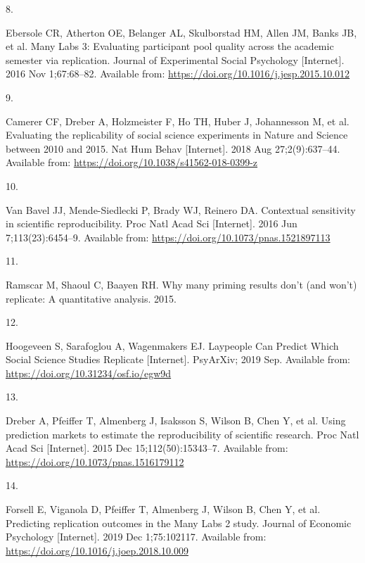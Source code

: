 \documentclass[
  english,
  a4paper,
]{article}
\newlength{\cslhangindent}
\newlength{\csllabelwidth}
\newlength{\cslentryspacingunit} %
\newenvironment{CSLReferences}[2] %
 {%
  \setlength{\parindent}{0pt}
  \ifodd #1
  \let\oldpar\par
  \def\par{\hangindent=\cslhangindent\oldpar}
  \fi
  \setlength{\parskip}{#2\cslentryspacingunit}
 }%
 {}
\newcommand{\CSLLeftMargin}[1]{\parbox[t]{\csllabelwidth}{#1}}
\newcommand{\CSLRightInline}[1]{\parbox[t]{\linewidth - \csllabelwidth}{#1}\break}
\begin{document}
\begin{CSLReferences}{0}{0}
\leavevmode{}%
\CSLLeftMargin{8. }%
\CSLRightInline{Ebersole CR, Atherton OE, Belanger AL, Skulborstad HM, Allen JM, Banks JB, et al. Many {Labs} 3: {Evaluating} participant pool quality across the academic semester via replication. Journal of Experimental Social Psychology {[}Internet{]}. 2016 Nov 1;67:68--82. Available from: \url{https://doi.org/10.1016/j.jesp.2015.10.012}}

\leavevmode{}%
\CSLLeftMargin{9. }%
\CSLRightInline{Camerer CF, Dreber A, Holzmeister F, Ho TH, Huber J, Johannesson M, et al. Evaluating the replicability of social science experiments in {Nature} and {Science} between 2010 and 2015. Nat Hum Behav {[}Internet{]}. 2018 Aug 27;2(9):637--44. Available from: \url{https://doi.org/10.1038/s41562-018-0399-z}}

\leavevmode{}%
\CSLLeftMargin{10. }%
\CSLRightInline{Van Bavel JJ, Mende-Siedlecki P, Brady WJ, Reinero DA. Contextual sensitivity in scientific reproducibility. Proc Natl Acad Sci {[}Internet{]}. 2016 Jun 7;113(23):6454--9. Available from: \url{https://doi.org/10.1073/pnas.1521897113}}

\leavevmode{}%
\CSLLeftMargin{11. }%
\CSLRightInline{Ramscar M, Shaoul C, Baayen RH. Why many priming results don't (and won't) replicate: {A} quantitative analysis. 2015. }

\leavevmode{}%
\CSLLeftMargin{12. }%
\CSLRightInline{Hoogeveen S, Sarafoglou A, Wagenmakers EJ. Laypeople {Can Predict Which Social Science Studies Replicate} {[}Internet{]}. {PsyArXiv}; 2019 Sep. Available from: \url{https://doi.org/10.31234/osf.io/egw9d}}

\leavevmode{}%
\CSLLeftMargin{13. }%
\CSLRightInline{Dreber A, Pfeiffer T, Almenberg J, Isaksson S, Wilson B, Chen Y, et al. Using prediction markets to estimate the reproducibility of scientific research. Proc Natl Acad Sci {[}Internet{]}. 2015 Dec 15;112(50):15343--7. Available from: \url{https://doi.org/10.1073/pnas.1516179112}}

\leavevmode{}%
\CSLLeftMargin{14. }%
\CSLRightInline{Forsell E, Viganola D, Pfeiffer T, Almenberg J, Wilson B, Chen Y, et al. Predicting replication outcomes in the {Many Labs} 2 study. Journal of Economic Psychology {[}Internet{]}. 2019 Dec 1;75:102117. Available from: \url{https://doi.org/10.1016/j.joep.2018.10.009}}


\end{CSLReferences}
\end{document}
